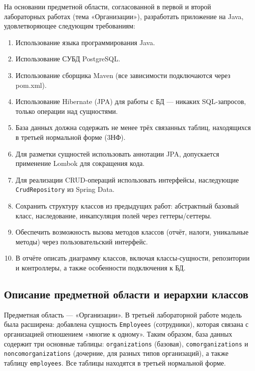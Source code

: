 \documentclass[oneside,a4paper,14pt]{extarticle}
\begin{document}
На основании предметной области, согласованной в первой и второй лабораторных работах (тема «Организации»), разработать приложение на Java, удовлетворяющее следующим требованиям:

\begin{enumerate}
	\item Использование языка программирования Java.
	\item Использование СУБД PostgreSQL.
	\item Использование сборщика Maven (все зависимости подключаются через pom.xml).
	\item Использование Hibernate (JPA) для работы с БД — никаких SQL-запросов, только операции над сущностями.
	\item База данных должна содержать не менее трёх связанных таблиц, находящихся в третьей нормальной форме (3НФ).
	\item Для разметки сущностей использовать аннотации JPA, допускается применение Lombok для сокращения кода.
	\item Для реализации CRUD-операций использовать интерфейсы, наследующие \texttt{CrudRepository} из Spring Data.
	\item Сохранить структуру классов из предыдущих работ: абстрактный базовый класс, наследование, инкапсуляция полей через геттеры/сеттеры.
	\item Обеспечить возможность вызова методов классов (отчёт, налоги, уникальные методы) через пользовательский интерфейс.
	\item В отчёте описать диаграмму классов, включая классы-сущности, репозитории и контроллеры, а также особенности подключения к БД.
\end{enumerate}

\newpage

\subsection*{Описание предметной области и иерархии классов}

Предметная область — «Организации». В третьей лабораторной работе модель была расширена: добавлена сущность \texttt{Employees} (сотрудники), которая связана с организацией отношением «многие к одному». Таким образом, база данных содержит три основные таблицы: \texttt{organizations} (базовая), \texttt{comorganizations} и \texttt{noncomorganizations} (дочерние, для разных типов организаций), а также таблицу \texttt{employees}. Все таблицы находятся в третьей нормальной форме.
\end{document}

